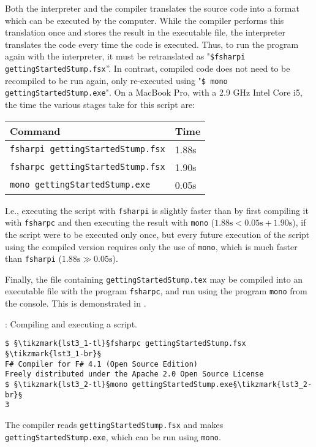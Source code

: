 \documentclass[fsharpNotes.tex]{subfiles}
\begin{document}
Both the interpreter and the compiler translates the source code into a format which can be executed by the computer. While the compiler performs this translation once and stores the result in the executable file, the interpreter translates the code every time the code is executed. Thus, to run the program again with the interpreter, it must be retranslated as "\lstinline[language=console]{$fsharpi gettingStartedStump.fsx}''. %
In contrast, compiled code does not need to be recompiled to be run again, only re-executed using "\lstinline[language=console]{$ mono gettingStartedStump.exe}". %
On a MacBook Pro, with a 2.9 GHz Intel Core i5, the time the various stages take for this script are:
\begin{center}
  \begin{tabular}{|l|l|}
    \hline
    \rowcolor{headerRowColor} Command & Time\\
    \hline
    \lstinline[language=console]|fsharpi gettingStartedStump.fsx| & 1.88s\\
    \lstinline[language=console]|fsharpc gettingStartedStump.fsx| & 1.90s\\
    \lstinline[language=console]|mono gettingStartedStump.exe| & 0.05s\\
    \hline
\end{tabular}
\end{center}
I.e., executing the script with \lstinline[language=console]|fsharpi| is slightly faster than by first compiling it with \lstinline[language=console]|fsharpc| and then executing the result with \lstinline[language=console]|mono| ($1.88\text{s} < 0.05\text{s}+1.90\text{s}$), if the script were to be executed only once, but every future execution of the script using the compiled version requires only the use of \lstinline[language=console]|mono|, which is much faster than \lstinline[language=console]|fsharpi| ($1.88\text{s}\gg 0.05\text{s}$).

Finally, the file containing \lstinline[language=console]{gettingStartedStump.tex} may be compiled into an executable file with the program \lstinline[language=console]{fsharpc}, and run using the program \lstinline[language=console]{mono} from the console. This is demonstrated in .
%
\begin{codeNOutput}[label=compiler,
  top=-5pt,
  bottom=-5pt,
  left=-2pt,
  right=-2pt,
]{: Compiling and executing a script.}
\begin{lstlisting}[language=console,escapechar=§]
$ §\tikzmark{lst3_1-tl}§fsharpc gettingStartedStump.fsx §\tikzmark{lst3_1-br}§
F# Compiler for F# 4.1 (Open Source Edition)
Freely distributed under the Apache 2.0 Open Source License
$ §\tikzmark{lst3_2-tl}§mono gettingStartedStump.exe§\tikzmark{lst3_2-br}§
3
\end{lstlisting}
%
%
\end{codeNOutput}
%
The compiler reads \lstinline[language=console]{gettingStartedStump.fsx} and makes \lstinline[language=console]{gettingStartedStump.exe}, which can be run using \lstinline[language=console]{mono}.
\end{document}
